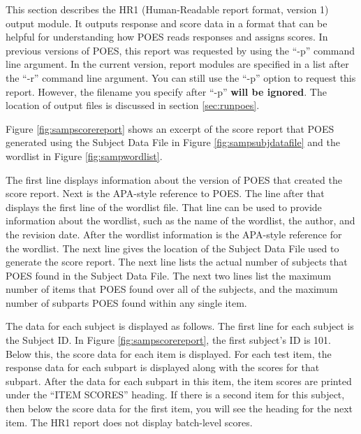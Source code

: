 \documentclass[11pt]{article}
\numberwithin{figure}{section}
\numberwithin{table}{section}
\begin{document}
This section describes the HR1 (Human-Readable report format, version 1) output module.  It outputs response and score data in a format that can be helpful for understanding how POES reads responses and assigns scores.  In previous versions of POES, this report was requested by using the ``-p'' command line argument.  In the current version, report modules are specified in a list after the ``-r'' command line argument.  You can still use the ``-p'' option to request this report.  However, the filename you specify after ``-p'' \textbf{will be ignored}.  The location of output files is discussed in section \ref{sec:runpoes}.

Figure \ref{fig:sampscorereport} shows an excerpt of the score report that POES generated using the Subject Data File in Figure \ref{fig:sampsubjdatafile} and the wordlist in Figure \ref{fig:sampwordlist}.

The first line displays information about the version of POES that created the score report.  Next is the APA-style reference to POES.  The line after that displays the first line of the wordlist file.  That line can be used to provide information about the wordlist, such as the name of the wordlist, the author, and the revision date.  After the wordlist information is the APA-style reference for the wordlist.  The next line gives the location of the Subject Data File used to generate the score report.  The next line lists the actual number of subjects that POES found in the Subject Data File.  The next two lines list the maximum number of items that POES found over all of the subjects, and the maximum number of subparts POES found within any single item.

The data for each subject is displayed as follows.  The first line for each subject is the Subject ID.  In Figure \ref{fig:sampscorereport}, the first subject's ID is 101.  Below this, the score data for each item is displayed.  For each test item, the response data for each subpart is displayed along with the scores for that subpart.  After the data for each subpart in this item, the item scores are printed under the ``ITEM SCORES'' heading.  
If there is a second item for this subject, then below the score data for the first item, you will see the heading for the next item.
The HR1 report does not display batch-level scores.
\end{document}

